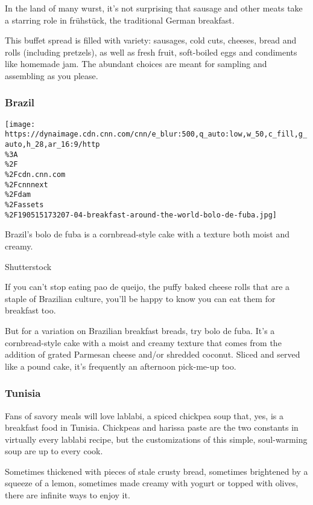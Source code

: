 In the land of many wurst, it's not surprising that sausage and other
meats take a starring role in frühstück, the traditional German
breakfast.

This buffet spread is filled with variety: sausages, cold cuts, cheeses,
bread and rolls (including pretzels), as well as fresh fruit,
soft-boiled eggs and condiments like homemade jam. The abundant choices
are meant for sampling and assembling as you please.

\hypertarget{brazil}{%
\subsubsection{Brazil}\label{brazil}}

\href{/travel/article/breakfast-food-around-the-world/index.html?gallery=9}{}

\texttt{[image: https://dynaimage.cdn.cnn.com/cnn/e\_blur:500,q\_auto:low,w\_50,c\_fill,g\_auto,h\_28,ar\_16:9/http\\\%3A\\\%2F\\\%2Fcdn.cnn.com\\\%2Fcnnnext\\\%2Fdam\\\%2Fassets\\\%2F190515173207-04-breakfast-around-the-world-bolo-de-fuba.jpg]}

Brazil's bolo de fuba is a cornbread-style cake with a texture both
moist and creamy.

Shutterstock

If you can't stop eating pao de queijo, the puffy baked cheese rolls
that are a staple of Brazilian culture, you'll be happy to know you can
eat them for breakfast too.

But for a variation on Brazilian breakfast breads, try bolo de fuba.
It's a cornbread-style cake with a moist and creamy texture that comes
from the addition of grated Parmesan cheese and/or shredded coconut.
Sliced and served like a pound cake, it's frequently an afternoon
pick-me-up too.

\hypertarget{tunisia}{%
\subsubsection{Tunisia}\label{tunisia}}

Fans of savory meals will love lablabi, a spiced chickpea soup that,
yes, is a breakfast food in Tunisia. Chickpeas and harissa paste are the
two constants in virtually every lablabi recipe, but the customizations
of this simple, soul-warming soup are up to every cook.

Sometimes thickened with pieces of stale crusty bread, sometimes
brightened by a squeeze of a lemon, sometimes made creamy with yogurt or
topped with olives, there are infinite ways to enjoy it.

